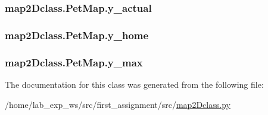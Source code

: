 \subsubsection[{\texorpdfstring{y\+\_\+actual}{y_actual}}]{\setlength{\rightskip}{0pt plus 5cm}map2\+Dclass.\+Pet\+Map.\+y\+\_\+actual}\hypertarget{classmap2Dclass_1_1PetMap_a5f4829bd696c1737b16917dc07e3d523}{}\label{classmap2Dclass_1_1PetMap_a5f4829bd696c1737b16917dc07e3d523}
\subsubsection[{\texorpdfstring{y\+\_\+home}{y_home}}]{\setlength{\rightskip}{0pt plus 5cm}map2\+Dclass.\+Pet\+Map.\+y\+\_\+home}\hypertarget{classmap2Dclass_1_1PetMap_ad52ba76f38e067e57e7b221645f50cb9}{}\label{classmap2Dclass_1_1PetMap_ad52ba76f38e067e57e7b221645f50cb9}
\subsubsection[{\texorpdfstring{y\+\_\+max}{y_max}}]{\setlength{\rightskip}{0pt plus 5cm}map2\+Dclass.\+Pet\+Map.\+y\+\_\+max}\hypertarget{classmap2Dclass_1_1PetMap_a663585a180d6c38e4eed57900ea2ce1c}{}\label{classmap2Dclass_1_1PetMap_a663585a180d6c38e4eed57900ea2ce1c}


The documentation for this class was generated from the following file\+:\begin{DoxyCompactItemize}
\item 
/home/lab\+\_\+exp\+\_\+ws/src/first\+\_\+assignment/src/\hyperlink{map2Dclass_8py}{map2\+Dclass.\+py}\end{DoxyCompactItemize}
